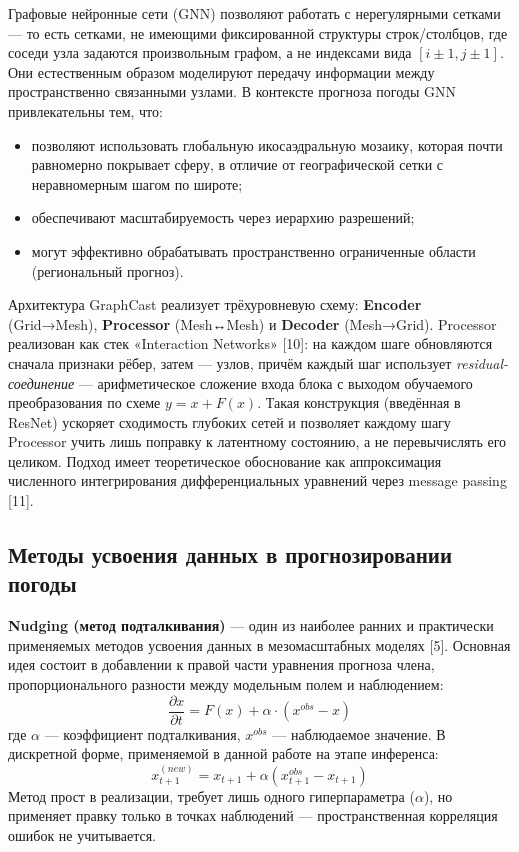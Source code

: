 \documentclass[14pt,a4paper]{extarticle}
\numberwithin{table}{section}
\numberwithin{figure}{section}
\numberwithin{equation}{section}
\begin{document}
Графовые нейронные сети (GNN) позволяют работать с нерегулярными
сетками --- то есть сетками, не имеющими фиксированной структуры
строк/столбцов, где соседи узла задаются произвольным графом, а не
индексами вида \([i\pm 1, j\pm 1]\). Они естественным образом
моделируют передачу информации между пространственно связанными
узлами. В контексте прогноза погоды GNN привлекательны тем, что:
\begin{itemize}
\item позволяют использовать глобальную икосаэдральную мозаику,
которая почти равномерно покрывает сферу, в отличие от географической
сетки с неравномерным шагом по широте;
\item обеспечивают масштабируемость через иерархию разрешений;
\item могут эффективно обрабатывать пространственно ограниченные
области (региональный прогноз).
\end{itemize}

Архитектура GraphCast реализует трёхуровневую схему: \textbf{Encoder}
(Grid→Mesh), \textbf{Processor} (Mesh↔Mesh) и \textbf{Decoder}
(Mesh→Grid). Processor реализован как стек «Interaction Networks»
{[}10{]}: на каждом шаге обновляются сначала признаки рёбер, затем ---
узлов, причём каждый шаг использует \emph{residual-соединение}
--- арифметическое сложение входа блока с выходом обучаемого
преобразования по схеме \(y = x + F(x)\). Такая конструкция (введённая
в ResNet) ускоряет сходимость глубоких сетей и позволяет каждому шагу
Processor учить лишь поправку к латентному состоянию, а не
перевычислять его целиком. Подход имеет теоретическое обоснование как
аппроксимация численного интегрирования дифференциальных уравнений
через message passing {[}11{]}.

\subsection{Методы усвоения данных в прогнозировании погоды}\label{ux43cux435ux442ux43eux434ux44b-ux443ux441ux432ux43eux435ux43dux438ux44f-ux434ux430ux43dux43dux44bux445-ux432-ux43fux440ux43eux433ux43dux43eux437ux438ux440ux43eux432ux430ux43dux438ux438-ux43fux43eux433ux43eux434ux44b}

\textbf{Nudging (метод подталкивания)} --- один из наиболее ранних и
практически применяемых методов усвоения данных в мезомасштабных моделях
{[}5{]}. Основная идея состоит в добавлении к правой части уравнения
прогноза члена, пропорционального разности между модельным полем и
наблюдением:
\[\frac{\partial x}{\partial t} = F(x) + \alpha \cdot (x^{obs} - x)\]
где \(\alpha\) --- коэффициент подталкивания, \(x^{obs}\) ---
наблюдаемое значение. В дискретной форме, применяемой в данной работе на
этапе инференса:
\[x_{t+1}^{(new)} = x_{t+1} + \alpha (x_{t+1}^{obs} - x_{t+1})\] Метод
прост в реализации, требует лишь одного гиперпараметра (\(\alpha\)), но
применяет правку только в точках наблюдений --- пространственная
корреляция ошибок не учитывается.
\end{document}
